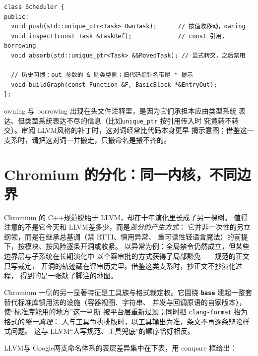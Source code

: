 \documentclass[12pt,a4paper,fontset=fandol]{ctexbook}
\newcommand{\Tp}[1]{\texttt{#1}}
\newcommand{\Lib}[1]{\textbf{\texttt{#1}}}
\newcommand{\Lang}[1]{\textsf{#1}}
\newcommand{\CPP}{\Lang{C++}}
\newcommand{\DomGo}{\Lang{Google}}
\newcommand{\DomLlvm}{\Lang{LLVM}}
\begin{document}
\begin{lstlisting}[style=cppstyle,caption={形参三态与 owning/borrowing 注释词},label={lst:ch03-signature}]
class Scheduler {
public:
  void push(std::unique_ptr<Task> OwnTask);      // 按值收移动，owning
  void inspect(const Task &TaskRef);             // const 引用，borrowing
  void absorb(std::unique_ptr<Task> &&MovedTask); // 显式转交，之后禁用

  // 历史习惯：out 参数的 & 贴类型侧；旧代码指针名带尾 * 提示
  void buildGraph(const Function &F, BasicBlock *&EntryOut);
};
\end{lstlisting}

\begin{note}[title={注释词不是装饰}]
owning 与 borrowing 出现在头文件注释里，是因为它们承担本应由类型系统
表达、但类型系统表达不尽的信息（比如\Tp{unique\_ptr} 按引用传入时
究竟转不转交）。审阅 \DomLlvm 风格的补丁时，这对词经常比代码本身更早
揭示意图；借鉴这一支系时，请把这对词一并搬走，只搬命名是搬不齐的。
\end{note}

\section{Chromium 的分化：同一内核，不同边界}
\label{sec:ch03-chromium}

Chromium 的 \CPP 规范脱胎于 \DomLlvm，却在十年演化里长成了另一棵树。
值得注意的不是它今天和 \DomLlvm 差多少，而是\emph{差分的产生方式}：
它并非一次性的另立纲领，而是在继承总基调（禁 RTTI、慎用异常、
重可读性轻语言魔法）的前提下，按模块、按风险逐条开洞或收紧。
以异常为例：全局禁令仍然成立，但某些边界层与子系统在长期演化中
以个案审批的方式获得了局部豁免——规范的正文只写裁定，
开洞的轨迹藏在评审历史里。借鉴这类支系时，抄正文不抄演化过程，
得到的是一张缺了脚注的地图。

Chromium 一侧的另一显著特征是工具族与格式裁定权。它围绕
\Lib{base} 建起一整套替代标准库惯用法的设施（容器视图、字符串、
并发与回调原语的自家版本），使``标准库能用的地方''这一判断
被平台层重新过滤；同时把 \Tp{clang-format} 抬为格式的\emph{唯一真理}：
人与工具争执排版时，以工具输出为准，条文不再逐条辩论样式问题。
这与 \DomLlvm``人写规范、工具兜底''的顺序恰好相反。

\DomLlvm 与 \DomGo 两支命名体系的表层差异集中在下表，用 compare 框给出：
\end{document}
